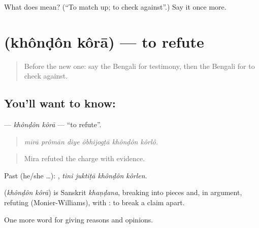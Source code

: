\begin{tcolorbox}[breakable,colback=teal!4,colframe=teal!35!black,title={Before you move on}]
What does  mean? (\textquotedblleft{}To match up; to check against\textquotedblright{}.) Say it once more.
\end{tcolorbox}
\section[\texorpdfstring{\bn{খণ্ডন} \bn{করা} (khônḍôn kôrā)}{খণ্ডন করা (khônḍôn kôrā)}]{  (khônḍôn kôrā) — to refute}

\label{lesson:BN-C338-khondon-kora}



\begin{quote}
Before the new one: say the Bengali for testimony, then the Bengali for to check against.
\end{quote}

\subsection*{You'll want to know:  }
\textbf{ } — \emph{khônḍôn kôrā} — \textquotedblleft{}to refute\textquotedblright{}.

\begin{quote}
     
\end{quote}

\begin{quote}
\emph{mīrā prômān diye ôbhijogṭā khônḍôn kôrlô.}
\end{quote}

\begin{quote}
Mira refuted the charge with evidence.
\end{quote}

Past (he/she …):    , \emph{tini juktiṭā khônḍôn kôrlen}.

\begin{cousinweb}
\textbf{ } (\emph{khônḍôn kôrā}) is Sanskrit \emph{khaṇḍana}, breaking into pieces and, in argument, refuting (Monier-Williams), with : to break a claim apart.
\end{cousinweb}

\begin{grammarlens}[title={What you've built}]
One more word for giving reasons and opinions.
\end{grammarlens}

